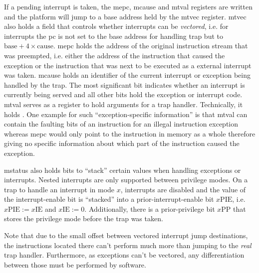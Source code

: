 If a pending interrupt is taken, the \gls{mepc}, \gls{mcause} and \gls{mtval} registers are written and the platform will jump to a base address held by the \gls{mtvec} register.
\gls{mtvec} also holds a field that controls whether interrupts can be \textit{vectored}, i.e. for interrupts the \gls{pc} is not set to the base address for handling trap but to $ \text{base} + 4 \times \text{cause} $.
\gls{mepc} holds the address of the original instruction stream that was preempted, i.e. either the address of the instruction that caused the exception or the instruction that was next to be executed as a external interrupt was taken.
\gls{mcause} holds an identifier of the current interrupt or exception being handled by the trap.
The most significant bit indicates whether an interrupt is currently being served and all other bits hold the exception or interrupt code.
\gls{mtval} serves as a register to hold arguments for a trap handler.
Technically, it holds .
One example for such \enquote{exception-specific information} is that \gls{mtval} can contain the faulting bits of an instruction for an illegal instruction exception whereas \gls{mepc} would only point to the instruction in memory as a whole therefore giving no specific information about which part of the instruction caused the exception.

\gls{mstatus} also holds bits to \enquote{stack} certain values when handling exceptions or interrupts.
Nested interrupts are only supported between privilege modes.
On a trap to handle an interrupt in mode $ x $, interrupts are disabled and the value of the interrupt-enable bit is \enquote{stacked} into a prior-interrupt-enable bit $x\text{PIE} $, i.e. $ x\text{PIE} := x\text{IE} $ and $ x\text{IE} := 0 $.
Additionally, there is a prior-privilege bit $ x\text{PP} $ that stores the privilege mode before the trap was taken.

Note that due to the small offset between vectored interrupt jump destinations, the instructions located there can't perform much more than jumping to the \textit{real} trap handler.
Furthermore, as exceptions can't be vectored, any differentiation between those must be performed by software.

